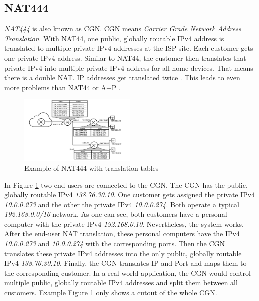 \documentclass[format=sigconf, natbib=true, nonacm=true]{acmart}
\begin{document}
    \subsection{NAT444}
    \textit{NAT444} is also known as CGN. CGN means \textit{Carrier Grade Network Address Translation}. With NAT44, one public, globally routable IPv4 address is translated to multiple private IPv4 addresses at the ISP site. Each customer gets one private IPv4 address. Similar to NAT44, the customer then translates that private IPv4 into multiple private IPv4 address for all home devices. That means there is a double NAT. IP addresses get translated twice \cite{10.1145/2987443.2987474}. This leads to even more problems than NAT44 or A+P \cite{8716482}.
    \begin{figure}
        \centering
        \includegraphics[width=0.5\textwidth]{images/nat_444.png}
        \caption{Example of NAT444 with translation tables}
        \label{fig:nat_444}
    \end{figure}
    In Figure \ref{fig:nat_444} two end-users are connected to the CGN. The CGN has the public, globally routable IPv4 \textit{138.76.30.10}. One customer gets assigned the private IPv4 \textit{10.0.0.273} and the other the private IPv4 \textit{10.0.0.274}. Both operate a typical \textit{192.168.0.0/16} network. As one can see, both customers have a personal computer with the private IPv4 \textit{192.168.0.10}. Nevertheless, the system works. After the end-user NAT translation, these personal computers have the IPv4 \textit{10.0.0.273} and \textit{10.0.0.274} with the corresponding ports. Then the CGN translates these private IPv4 addresses into the only public, globally routable IPv4 \textit{138.76.30.10}. Finally, the CGN translates IP and Port and maps them to the corresponding customer. In a real-world application, the CGN would control multiple public, globally routable IPv4 addresses and split them between all customers. Example Figure \ref{fig:nat_444} only shows a cutout of the whole CGN\cite{Hughes2022_C11}.
\end{document}
